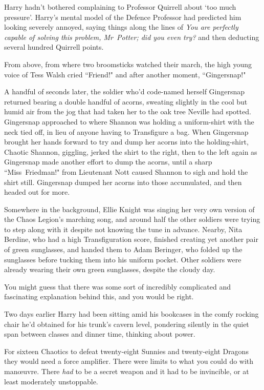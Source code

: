 Harry hadn't bothered complaining to Professor Quirrell about `too much pressure'. Harry's mental model of the Defence Professor had predicted him looking severely annoyed, saying things along the lines of \emph{You are perfectly capable of solving this problem, Mr~Potter; did you even try?} and then deducting several hundred Quirrell points.

From above, from where two broomsticks watched their march, the high young voice of Tess Walsh cried ``Friend!" and after another moment, ``Gingersnap!"

A handful of seconds later, the soldier who'd code-named herself Gingersnap returned bearing a double handful of acorns, sweating slightly in the cool but humid air from the jog that had taken her to the oak tree Neville had spotted. Gingersnap approached to where Shannon was holding a uniform-shirt with the neck tied off, in lieu of anyone having to Transfigure a bag. When Gingersnap brought her hands forward to try and dump her acorns into the holding-shirt, Chaotic Shannon, giggling, jerked the shirt to the right, then to the left again as Gingersnap made another effort to dump the acorns, until a sharp ``Miss~Friedman!" from Lieutenant Nott caused Shannon to sigh and hold the shirt still. Gingersnap dumped her acorns into those accumulated, and then headed out for more.

Somewhere in the background, Ellie Knight was singing her very own version of the Chaos Legion's marching song, and around half the other soldiers were trying to step along with it despite not knowing the tune in advance. Nearby, Nita Berdine, who had a high Transfiguration score, finished creating yet another pair of green sunglasses, and handed them to Adam Beringer, who folded up the sunglasses before tucking them into his uniform pocket. Other soldiers were already wearing their own green sunglasses, despite the cloudy day.

You might guess that there was some sort of incredibly complicated and fascinating explanation behind this, and you would be right.

Two days earlier Harry had been sitting amid his bookcases in the comfy rocking chair he'd obtained for his trunk's cavern level, pondering silently in the quiet span between classes and dinner time, thinking about power.

For sixteen Chaotics to defeat twenty-eight Sunnies and twenty-eight Dragons they would need a force amplifier. There were limits to what you could do with manœuvre. There \emph{had} to be a secret weapon and it had to be invincible, or at least moderately unstoppable.

